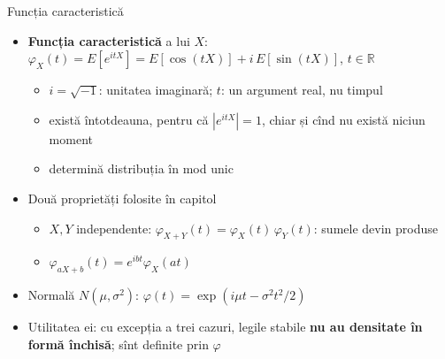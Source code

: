 \begin{frame}{Funcția caracteristică}
\itemsize{\small}
\begin{itemize}
    \item \textbf{Funcția caracteristică} a lui $X$: $\varphi_X(t) = E[e^{itX}] = E[\cos(tX)] + i\,E[\sin(tX)]$, $t \in \mathbb{R}$
    \begin{itemize}
        \item $i = \sqrt{-1}$: unitatea imaginară; $t$: un argument real, nu timpul
        \item există întotdeauna, pentru că $|e^{itX}| = 1$, chiar și cînd nu există niciun moment
        \item determină distribuția în mod unic
    \end{itemize}
    \item Două proprietăți folosite în capitol
    \begin{itemize}
        \item $X, Y$ independente: $\varphi_{X+Y}(t) = \varphi_X(t)\,\varphi_Y(t)$: sumele devin produse
        \item $\varphi_{aX+b}(t) = e^{ibt}\varphi_X(at)$
    \end{itemize}
    \item Normală $N(\mu, \sigma^2)$: $\varphi(t) = \exp(i\mu t - \sigma^2 t^2/2)$
    \item Utilitatea ei: cu excepția a trei cazuri, legile stabile \textbf{nu au densitate în formă închisă}; sînt definite prin $\varphi$
\end{itemize}
\end{frame}

